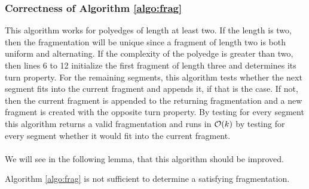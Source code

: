 \subsubsection*{Correctness of Algorithm \ref{algo:frag}}
This algorithm works for polyedges of length at least two. If the length is two, then the fragmentation will be unique since a fragment of length two is both uniform and alternating. If the complexity of the polyedge is greater than two, then lines 6 to 12 initialize the first fragment of length three and determines its turn property. For the remaining segments, this algorithm tests whether the next segment fits into the current fragment and appends it, if that is the case. If not, then the current fragment is appended to the returning fragmentation and a new fragment is created with the opposite turn property. By testing for every segment this algorithm returns a valid fragmentation and runs in $\mathcal{O}(k)$ by testing for every segment whether it would fit into the current fragment.
\\\\We will see in the following lemma, that this algorithm should be improved.
\begin{lemma}
	Algorithm \ref{algo:frag} is not sufficient to determine a satisfying fragmentation.
\end{lemma}
